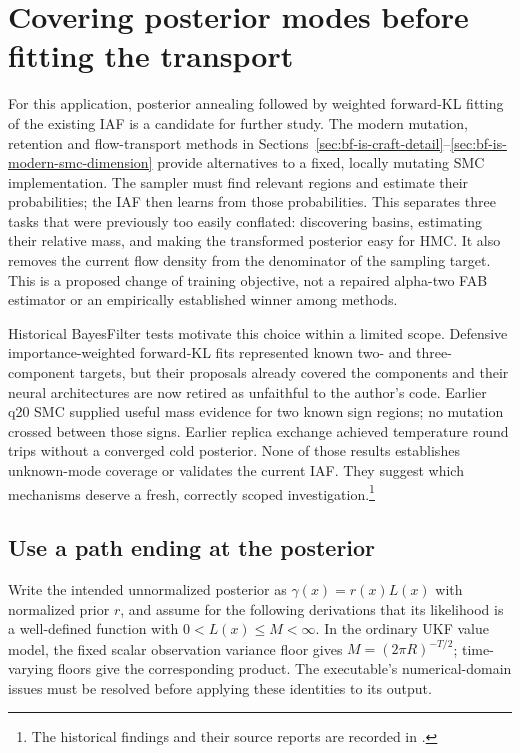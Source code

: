 \section[Posterior mode coverage]{Covering posterior modes before fitting the transport}
\label{sec:bf-is-multimode-recovery}

For this application, posterior annealing followed by weighted forward-KL
fitting of the existing IAF is a candidate for further study. The modern
mutation, retention and flow-transport methods in
Sections~\ref{sec:bf-is-craft-detail}--\ref{sec:bf-is-modern-smc-dimension}
provide alternatives to a fixed, locally mutating SMC implementation. The
sampler must find relevant regions and estimate their probabilities; the IAF
then learns from those probabilities. This separates three tasks that were
previously too easily conflated: discovering basins, estimating their relative
mass, and making the transformed posterior easy for HMC. It also removes the
current flow density from the denominator of the sampling target. This is a
proposed change of training objective, not a repaired alpha-two FAB estimator
or an empirically established winner among methods.

Historical BayesFilter tests motivate this choice within a limited scope.
Defensive importance-weighted forward-KL fits represented known two- and
three-component targets, but their proposals already covered the components
and their neural architectures are now retired as unfaithful to the author's
code. Earlier q20 SMC supplied useful mass evidence for two known sign regions;
no mutation crossed between those signs. Earlier replica exchange achieved
temperature round trips without a converged cold posterior. None of those
results establishes unknown-mode coverage or validates the current IAF. They
suggest which mechanisms deserve a fresh, correctly scoped investigation.\footnote{\raggedright
\def\UrlBreaks{\do\/\do\-}
The historical findings and their source reports are recorded in
.\par}

\subsection{Use a path ending at the posterior}

Write the intended unnormalized posterior as $\gamma(x)=r(x)L(x)$ with
normalized prior $r$, and assume for the following derivations that its
likelihood is a well-defined function with $0<L(x)\le M<\infty$. In the
ordinary UKF value model, the fixed scalar observation variance floor gives
$M=(2\pi R)^{-T/2}$; time-varying floors give the corresponding product.
The executable's numerical-domain issues must be resolved before applying
these identities to its output.

